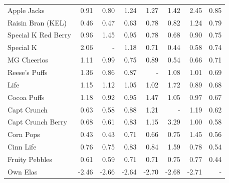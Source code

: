 \begin{frame}[plain]
\begin{center}
{\begin{tabular}{lrrrrrrr}
Apple Jacks         &      0.91 &       0.80 &         1.24 &           1.27 &         1.42 &         2.45 &    0.85 \\
Raisin Bran (KEL)   &      0.46 &       0.47 &         0.63 &           0.78 &         0.82 &         1.24 &    0.79 \\
Special K Red Berry &      0.96 &       1.45 &         0.95 &           0.78 &         0.68 &         0.90 &    0.75 \\
Special K           &      2.06 &      - &         1.18 &           0.71 &         0.44 &         0.58 &    0.74 \\
MG Cheerios         &      1.11 &       0.99 &         0.75 &           0.89 &         0.54 &         0.66 &    0.71 \\
Reese's Puffs       &      1.36 &       0.86 &         0.87 &          - &         1.08 &         1.01 &    0.69 \\
Life                &      1.15 &       1.12 &         1.05 &           1.02 &         1.72 &         0.89 &    0.68 \\
Cocoa Puffs         &      1.18 &       0.92 &         0.95 &           1.47 &         1.05 &         0.97 &    0.67 \\
Capt Crunch         &      0.63 &       0.58 &         0.88 &           1.21 &        - &         1.19 &    0.62 \\
Capt Crunch Berry   &      0.68 &       0.61 &         0.83 &           1.15 &         3.29 &         1.00 &    0.58 \\
Corn Pops           &      0.43 &       0.43 &         0.71 &           0.66 &         0.75 &         1.45 &    0.56 \\
Cinn Life           &      0.76 &       0.75 &         0.83 &           0.84 &         1.59 &         0.78 &    0.54 \\
Fruity Pebbles      &      0.61 &       0.59 &         0.71 &           0.71 &         0.75 &         0.77 &    0.44 \\
\midrule
Own Elas            &      -2.46&       -2.66 &       -2.64 &           -2.70 &        -2.68 &       -2.71 &  - \\
\bottomrule
\end{tabular}
}
\end{center}
\end{frame}


